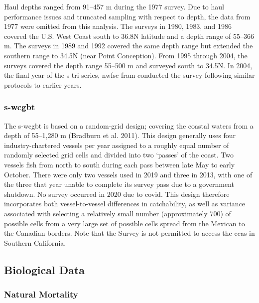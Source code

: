 \documentclass[11pt,
  letterpaper,
]{article}
\begin{document}
Haul depths ranged from 91--457 m during the 1977 survey. Due to haul performance issues and truncated sampling with respect to depth, the data from 1977 were omitted from this analysis. The surveys in 1980, 1983, and 1986 covered the U.S. West Coast south to 36.8\textdegree N latitude and a depth range of 55--366 m. The surveys in 1989 and 1992 covered the same depth range but extended the southern range to 34.5\textdegree N (near Point Conception). From 1995 through 2004, the surveys covered the depth range 55--500 m and surveyed south to 34.5\textdegree N. In 2004, the final year of the \gls{s-tri} series, \gls{nwfsc} \gls{fram} conducted the survey following similar protocols to earlier years.

\hypertarget{section-2}{%
\subsubsection{\texorpdfstring{\acrlong{s-wcgbt}}{}}\label{section-2}}

The \gls{s-wcgbt} is based on a random-grid design; covering the coastal waters from a depth of 55--1,280 m (Bradburn et al. 2011). This design generally uses four industry-chartered vessels per year assigned to a roughly equal number of randomly selected grid cells and divided into two `passes' of the coast. Two vessels fish from north to south during each pass between late May to early October. There were only two vessels used in 2019 and three in 2013, with one of the three that year unable to complete its survey pass due to a government shutdown. No survey occurred in 2020 due to \gls{covid}. This design therefore incorporates both vessel-to-vessel differences in catchability, as well as variance associated with selecting a relatively small number (approximately 700) of possible cells from a very large set of possible cells spread from the Mexican to the Canadian borders. Note that the Survey is not permitted to access the \glspl{cca} in Southern California.

\hypertarget{biological-data}{%
\subsection{Biological Data}\label{biological-data}}

\hypertarget{natural-mortality}{%
\subsubsection{Natural Mortality}\label{natural-mortality}}
\end{document}
